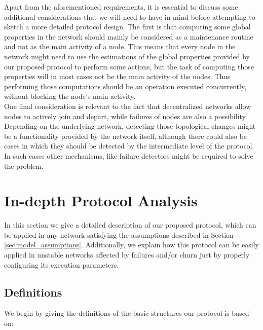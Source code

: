 \documentclass[a4paper,11pt,twoside]{report}
\begin{document}
Apart from the aforementioned requirements, it is essential to discuss some additional considerations that we will need to have in mind before attempting to sketch a more detailed protocol design. The first is that computing some global properties in the network should mainly be considered as a maintenance routine and not as the main activity of a node. This means that every node in the network might need to use the estimations of the global properties provided by our proposed protocol to perform some actions, but the task of computing those properties will in most  cases not be the main activity of the nodes. Thus performing those computations should be an operation executed concurrently, without blocking the node's main activity.\\

One final consideration is relevant to the fact that  decentralized networks allow nodes to actively join and depart, while failures of nodes are also a possibility. Depending on the underlying network, detecting those topological changes might be a functionality provided by the network itself, although there could also be cases in which they should be detected by the intermediate level of the protocol. In such cases other mechanisms, like failure detectors \cite{Chandra:1996:UFD:226643.226647} might be required to solve the problem.

\section{In-depth Protocol Analysis}

In this section we give a detailed description of our proposed protocol, which can be applied in any network satisfying the assumptions described in Section \ref{sec:model_assumptions}. Additionally, we explain how this protocol can be easily applied in unstable networks affected by failures and/or churn just by properly configuring its execution parameters. 


\subsection{Definitions}

We begin by giving the definitions of the basic structures our protocol is based on:
\end{document}
